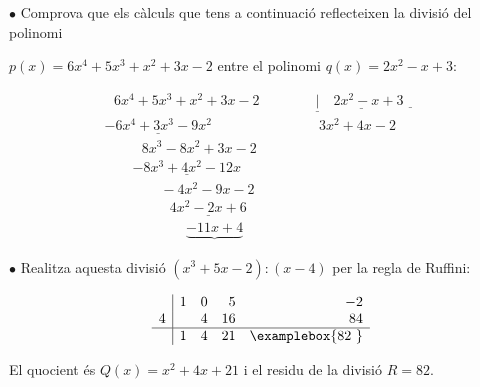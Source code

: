 \pagebreak

\begin{example}
 	$\bullet$ Comprova que els càlculs que tens a continuació reflecteixen la divisió del polinomi
	
	 $p(x)=6x^{4} +5x^{3} +x^{2} +3x-2$ entre el polinomi $q(x)=2x^{2} -x+3$:
	
	
	\[ \begin{array}{l} {\, \, \, \, 6x^{4} +5x^{3} +x^{2} +3x-2\quad \quad \quad \quad \underline{|}\underline{\quad 2x^{2} -x+3}\underline{\quad }} \\ {\underline{-6x^{4} +3x^{3} -9x^{2} }\, \, \, \, \, \, \, \, \, \, \, \, \, \, \, \, \, \, \, \, \, \, \, \, \, \, \, \, \, \, \, \, \, \, \, \, \, \, \, \, \quad 3x^{2} +4x-2\, } \\ {\, \, \, \, \, \, \, \, \, \, \, \, \, \, \, \, 8x^{3} -8x^{2} +3x-2} \\ {\, \, \, \, \, \, \, \, \, \, \, \, \underline{-8x^{3} +4x^{2} -12x}} \\ {\, \, \, \, \, \, \, \, \, \, \, \, \, \, \, \, \, \, \, \, \, \, \, \, -4x^{2} -9x-2} \\ {\, \, \, \, \, \, \, \, \, \, \, \, \, \, \, \, \, \, \, \, \, \, \, \, \, \, \, \, \underline{4x^{2} -2x+6}} \\ {\, \, \, \, \, \, \, \, \, \, \, \, \, \, \, \, \, \, \, \, \, \, \, \, \, \, \, \, \, \, \, \, \, \, \, \underbrace{-11x+4} } \end{array} \]
	
	
	$\bullet$ Realitza aquesta divisió $(x^3+5x-2) : (x-4)$ per la regla de Ruffini:
	
	\[ \begin{array}{r|rrrr}  & 1 & 0 & 5 & -2\\ 4 &  & 4 & 16 & 84 \\ \hline  & 1 & 4 & 21 & \examplebox{ 82 }\end{array} \]
	
	El quocient és $Q(x)=x^2+4x+21$ i el residu de la divisió $R=82$.
	\end{example}


